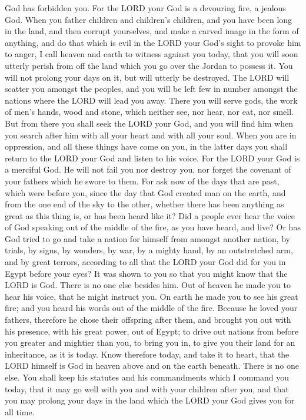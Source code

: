 God has forbidden you.  For the LORD your God is a
devouring fire, a jealous God.  When you father children
and children's children, and you have been long in the land, and then
corrupt yourselves, and make a carved image in the form of anything, and
do that which is evil in the LORD your God's sight to provoke him to
anger,  I call heaven and earth to witness against you
today, that you will soon utterly perish from off the land which you go
over the Jordan to possess it. You will not prolong your days on it, but
will utterly be destroyed.  The LORD will scatter you
amongst the peoples, and you will be left few in number amongst the
nations where the LORD will lead you away.  There you
will serve gods, the work of men's hands, wood and stone, which neither
see, nor hear, nor eat, nor smell.  But from there you
shall seek the LORD your God, and you will find him when you search
after him with all your heart and with all your soul. 
When you are in oppression, and all these things have come on you, in
the latter days you shall return to the LORD your God and listen to his
voice.  For the LORD your God is a merciful God. He will
not fail you nor destroy you, nor forget the covenant of your fathers
which he swore to them.  For ask now of the days that are
past, which were before you, since the day that God created man on the
earth, and from the one end of the sky to the other, whether there has
been anything as great as this thing is, or has been heard like it?
 Did a people ever hear the voice of God speaking out of
the middle of the fire, as you have heard, and live?  Or
has God tried to go and take a nation for himself from amongst another
nation, by trials, by signs, by wonders, by war, by a mighty hand, by an
outstretched arm, and by great terrors, according to all that the LORD
your God did for you in Egypt before your eyes?  It was
shown to you so that you might know that the LORD is God. There is no
one else besides him.  Out of heaven he made you to hear
his voice, that he might instruct you. On earth he made you to see his
great fire; and you heard his words out of the middle of the fire.
 Because he loved your fathers, therefore he chose their
offspring after them, and brought you out with his presence, with his
great power, out of Egypt;  to drive out nations from
before you greater and mightier than you, to bring you in, to give you
their land for an inheritance, as it is today.  Know
therefore today, and take it to heart, that the LORD himself is God in
heaven above and on the earth beneath. There is no one else.
 You shall keep his statutes and his commandments which I
command you today, that it may go well with you and with your children
after you, and that you may prolong your days in the land which the LORD
your God gives you for all time.

